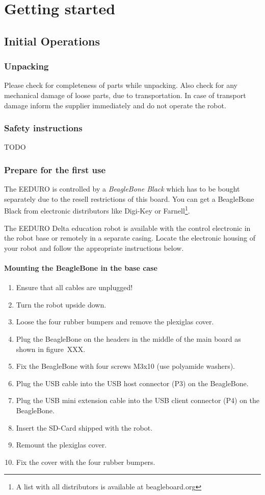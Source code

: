 \newpage

\chapter{Getting started}
\section{Initial Operations}
\subsection{Unpacking}
Please check for completeness of parts while unpacking. Also check for any mechanical damage of loose parts, due to transportation. In case of transport damage inform the supplier immediately and do not operate the robot.

\subsection{Safety instructions}
TODO

\subsection{Prepare for the first use}
The EEDURO is controlled by a \textit{BeagleBone Black} which has to be bought separately due to the resell restrictions of this board. You can get a BeagleBone Black from electronic distributors like Digi-Key or Farnell\footnote{A list with all distributors is available at beagleboard.org}.

The EEDURO Delta education robot is available with the control electronic in the robot base or remotely in a separate casing. Locate the electronic housing of your robot and follow the appropriate instructions below.

\subsubsection{Mounting the BeagleBone in the base case}
\begin{enumerate}
	\item Ensure that all cables are unplugged!
	\item Turn the robot upside down.
	\item Loose the four rubber bumpers and remove the plexiglas cover.
	\item Plug the BeagleBone on the headers in the middle of the main board as shown in figure~XXX.
	\item Fix the BeagleBone with four screws M3x10 (use polyamide washers).
	\item Plug the USB cable into the USB host connector (P3) on the BeagleBone.
	\item Plug the USB mini extension cable into the USB client connector (P4) on the BeagleBone.
	\item Insert the SD-Card shipped with the robot.
	\item Remount the plexiglas cover.
	\item Fix the cover with the four rubber bumpers.
\end{enumerate}

